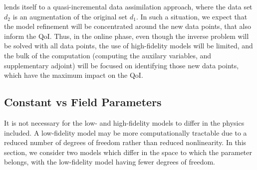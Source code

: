 %
 lends itself to a quasi-incremental data assimilation approach, where the data set $d_2$ is an augmentation of the original set $d_1$. In such a situation, we expect that the model refinement will be concentrated around the new data points, that also inform the QoI. Thus, in the online phase, even though the inverse problem will be solved with all data points, the use of high-fidelity models will be limited, and the bulk of the computation (computing the auxilary variables, and supplementary adjoint) will be focused on identifying those new data points, which have the maximum impact on the QoI.

%
%
%
%
%
%
%
%
%
%

\subsection{Constant vs Field Parameters} \label{sec:constvfield}
It is not necessary for the low- and high-fidelity models to differ in the physics included. A low-fidelity model may be more computationally tractable due to a reduced number of degrees of freedom rather than reduced nonlinearity. In this section, we consider two models which differ in the space to which the parameter belongs, with the low-fidelity model having fewer degrees of freedom.
